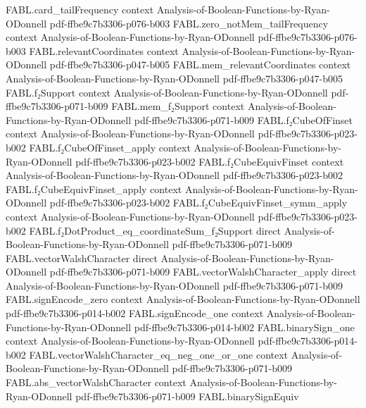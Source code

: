 \begin{theorem}
  {FABL.card_tailFrequency}
  {context}
  {Analysis-of-Boolean-Functions-by-Ryan-ODonnell}
  {pdf-ffbe9c7b3306-p076-b003}
\proofstep
  {FABL.zero_notMem_tailFrequency}
  {context}
  {Analysis-of-Boolean-Functions-by-Ryan-ODonnell}
  {pdf-ffbe9c7b3306-p076-b003}
\proofstep
  {FABL.relevantCoordinates}
  {context}
  {Analysis-of-Boolean-Functions-by-Ryan-ODonnell}
  {pdf-ffbe9c7b3306-p047-b005}
\proofstep
  {FABL.mem_relevantCoordinates}
  {context}
  {Analysis-of-Boolean-Functions-by-Ryan-ODonnell}
  {pdf-ffbe9c7b3306-p047-b005}
\proofstep
  {FABL.f₂Support}
  {context}
  {Analysis-of-Boolean-Functions-by-Ryan-ODonnell}
  {pdf-ffbe9c7b3306-p071-b009}
\proofstep
  {FABL.mem_f₂Support}
  {context}
  {Analysis-of-Boolean-Functions-by-Ryan-ODonnell}
  {pdf-ffbe9c7b3306-p071-b009}
\proofstep
  {FABL.f₂CubeOfFinset}
  {context}
  {Analysis-of-Boolean-Functions-by-Ryan-ODonnell}
  {pdf-ffbe9c7b3306-p023-b002}
\proofstep
  {FABL.f₂CubeOfFinset_apply}
  {context}
  {Analysis-of-Boolean-Functions-by-Ryan-ODonnell}
  {pdf-ffbe9c7b3306-p023-b002}
\proofstep
  {FABL.f₂CubeEquivFinset}
  {context}
  {Analysis-of-Boolean-Functions-by-Ryan-ODonnell}
  {pdf-ffbe9c7b3306-p023-b002}
\proofstep
  {FABL.f₂CubeEquivFinset_apply}
  {context}
  {Analysis-of-Boolean-Functions-by-Ryan-ODonnell}
  {pdf-ffbe9c7b3306-p023-b002}
\proofstep
  {FABL.f₂CubeEquivFinset_symm_apply}
  {context}
  {Analysis-of-Boolean-Functions-by-Ryan-ODonnell}
  {pdf-ffbe9c7b3306-p023-b002}
\proofstep
  {FABL.f₂DotProduct_eq_coordinateSum_f₂Support}
  {direct}
  {Analysis-of-Boolean-Functions-by-Ryan-ODonnell}
  {pdf-ffbe9c7b3306-p071-b009}
\proofstep
  {FABL.vectorWalshCharacter}
  {direct}
  {Analysis-of-Boolean-Functions-by-Ryan-ODonnell}
  {pdf-ffbe9c7b3306-p071-b009}
\proofstep
  {FABL.vectorWalshCharacter_apply}
  {direct}
  {Analysis-of-Boolean-Functions-by-Ryan-ODonnell}
  {pdf-ffbe9c7b3306-p071-b009}
\proofstep
  {FABL.signEncode_zero}
  {context}
  {Analysis-of-Boolean-Functions-by-Ryan-ODonnell}
  {pdf-ffbe9c7b3306-p014-b002}
\proofstep
  {FABL.signEncode_one}
  {context}
  {Analysis-of-Boolean-Functions-by-Ryan-ODonnell}
  {pdf-ffbe9c7b3306-p014-b002}
\proofstep
  {FABL.binarySign_one}
  {context}
  {Analysis-of-Boolean-Functions-by-Ryan-ODonnell}
  {pdf-ffbe9c7b3306-p014-b002}
\proofstep
  {FABL.vectorWalshCharacter_eq_neg_one_or_one}
  {context}
  {Analysis-of-Boolean-Functions-by-Ryan-ODonnell}
  {pdf-ffbe9c7b3306-p071-b009}
\proofstep
  {FABL.abs_vectorWalshCharacter}
  {context}
  {Analysis-of-Boolean-Functions-by-Ryan-ODonnell}
  {pdf-ffbe9c7b3306-p071-b009}
\proofstep
  {FABL.binarySignEquiv}

\end{theorem}
